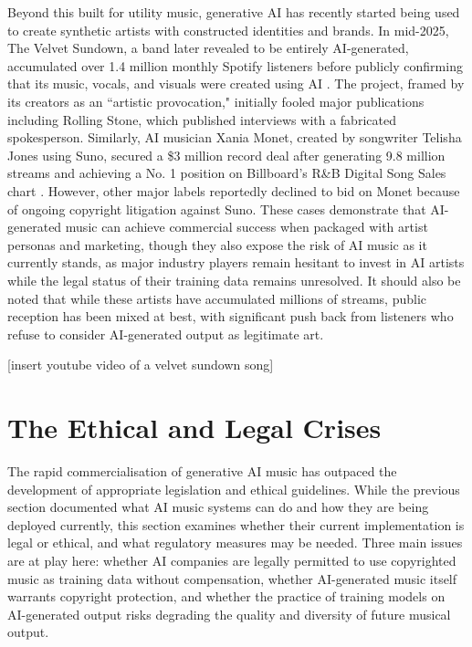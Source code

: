 \documentclass{article}
\begin{document}
Beyond this built for utility music, generative AI has recently started being used to create synthetic artists with constructed identities and brands. In mid-2025, The Velvet Sundown, a band later revealed to be entirely AI-generated, accumulated over 1.4 million monthly Spotify listeners before publicly confirming that its music, vocals, and visuals were created using AI \cite{berklee2025velvet}. The project, framed by its creators as an ``artistic provocation," initially fooled major publications including Rolling Stone, which published interviews with a fabricated spokesperson. Similarly, AI musician Xania Monet, created by songwriter Telisha Jones using Suno, secured a \$3 million record deal after generating 9.8 million streams and achieving a No. 1 position on Billboard's R\&B Digital Song Sales chart \cite{petraeus2025goodbye}. However, other major labels reportedly declined to bid on Monet because of ongoing copyright litigation against Suno. These cases demonstrate that AI-generated music can achieve commercial success when packaged with artist personas and marketing, though they also expose the risk of AI music as it currently stands, as major industry players remain hesitant to invest in AI artists while the legal status of their training data remains unresolved. It should also be noted that while these artists have accumulated millions of streams, public reception has been mixed at best, with significant push back from listeners who refuse to consider AI-generated output as legitimate art.

[insert youtube video of a velvet sundown song]

\section{The Ethical and Legal Crises}

The rapid commercialisation of generative AI music has outpaced the development of appropriate legislation and ethical guidelines. While the previous section documented what AI music systems can do and how they are being deployed currently, this section examines whether their current implementation is legal or ethical, and what regulatory measures may be needed. Three main issues are at play here: whether AI companies are legally permitted to use copyrighted music as training data without compensation, whether AI-generated music itself warrants copyright protection, and whether the practice of training models on AI-generated output risks degrading the quality and diversity of future musical output. 
\end{document}
